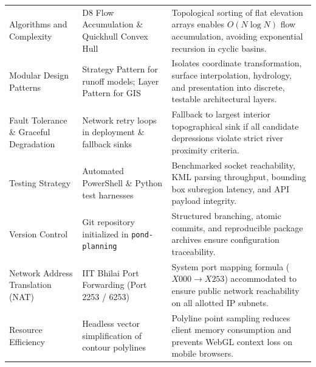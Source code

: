 \documentclass[manuscript,screen,review]{acmart}
\begin{document}
\begin{table}[t]
\begin{tabular}{p{3.2cm}p{5.0cm}p{6.8cm}}
    Algorithms and Complexity & D8 Flow Accumulation \& Quickhull Convex Hull & Topological sorting of flat elevation arrays enables $O(N \log N)$ flow accumulation, avoiding exponential recursion in cyclic basins. \\
    Modular Design Patterns & Strategy Pattern for runoff models; Layer Pattern for GIS & Isolates coordinate transformation, surface interpolation, hydrology, and presentation into discrete, testable architectural layers. \\
    Fault Tolerance \& Graceful Degradation & Network retry loops in deployment \& fallback sinks & Fallback to largest interior topographical sink if all candidate depressions violate strict river proximity criteria. \\
    Testing Strategy & Automated PowerShell \& Python test harnesses & Benchmarked socket reachability, KML parsing throughput, bounding box subregion latency, and API payload integrity. \\
    Version Control & Git repository initialized in \texttt{pond-planning} & Structured branching, atomic commits, and reproducible package archives ensure configuration traceability. \\
    Network Address Translation (NAT) & IIT Bhilai Port Forwarding (Port 2253 / 6253) & System port mapping formula ($X000 \rightarrow X253$) accommodated to ensure public network reachability on all allotted IP subnets. \\
    Resource Efficiency & Headless vector simplification of contour polylines & Polyline point sampling reduces client memory consumption and prevents WebGL context loss on mobile browsers. \\
    \bottomrule
  \end{tabular}
\end{table}
\end{document}
